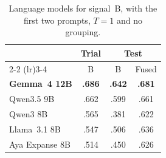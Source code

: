 \begin{table}[t]
\centering
\small
\setlength{\tabcolsep}{3pt}
\begin{tabular}{lccc}
\toprule
 & Trial & \multicolumn{2}{c}{Test} \\
\cmidrule(lr){2-2} \cmidrule(lr){3-4}
 & B & B & Fused \\
\midrule
\textbf{Gemma~4 12B} & \textbf{.686} & \textbf{.642} & \textbf{.681} \\ %
Qwen3.5 9B           & .662 & .599 & .661 \\ %
Qwen3 8B             & .565 & .381 & .622 \\ %
Llama~3.1 8B         & .547 & .506 & .636 \\ %
Aya Expanse 8B       & .514 & .450 & .626 \\ %
\bottomrule
\end{tabular}
\caption{Language models for signal~B, with the first two prompts, $T = 1$ and no grouping.}
\label{tab:llms}
\end{table}

